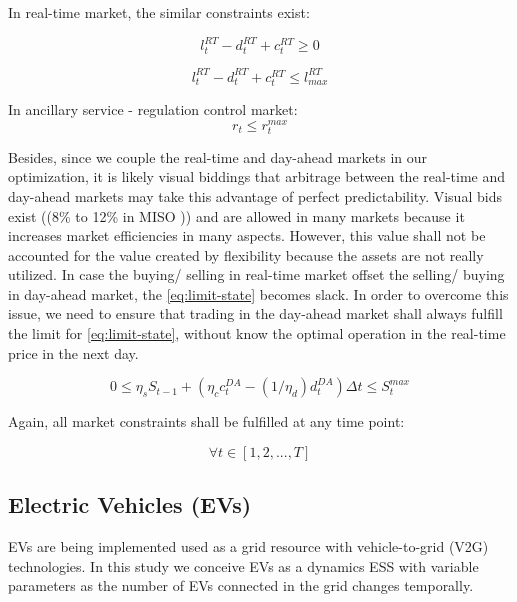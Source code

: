 In real-time market, the similar constraints exist: 

\begin{equation}
\label{eq:market-rt-low}
l_t^{RT} - d_t^{RT} + c_t^{RT} \geq 0
\end{equation}

\begin{equation}
\label{eq:market-rt-high}
l_t^{RT} - d_t^{RT} + c_t^{RT} \leq l_{max}^{RT}
\end{equation}

In ancillary service - regulation control market:
\begin{equation}
\label{eq:market-as-high}
r_t \leq r_t^{max}
\end{equation}

Besides, since we couple the real-time and day-ahead markets in our optimization, it is likely visual biddings that arbitrage between the real-time and day-ahead markets may take this advantage of perfect predictability. Visual bids exist ((8\% to 12\% in MISO \cite{Limit-visual-bid})) and are allowed in many markets because it increases market efficiencies in many aspects. However, this value shall not be accounted for the value created by flexibility because the assets are not really utilized. In case the buying/ selling in real-time market offset the selling/ buying in day-ahead market, the \eqref{eq:limit-state} becomes slack. In order to overcome this issue, we need to ensure that trading in the day-ahead market shall always fulfill the limit for \eqref{eq:limit-state}, without know the optimal operation in the real-time price in the next day.

\begin{equation}
\label{eq:virtual-bidding}
0 \leq  \eta_s S_{t-1} + (\eta_c c_t^{DA} - (1/\eta_d)d_t^{DA})\Delta t \leq S_t^{max}
\end{equation}

Again, all market constraints shall be fulfilled at any time point:

\begin{equation*}
\forall t \in [1, 2, ..., T]
\end{equation*}

\subsection{Electric Vehicles (EVs)}
EVs are being implemented used as a grid resource with vehicle-to-grid (V2G) technologies. In this study we conceive EVs as a dynamics ESS with variable parameters as the number of EVs connected in the grid changes temporally.

